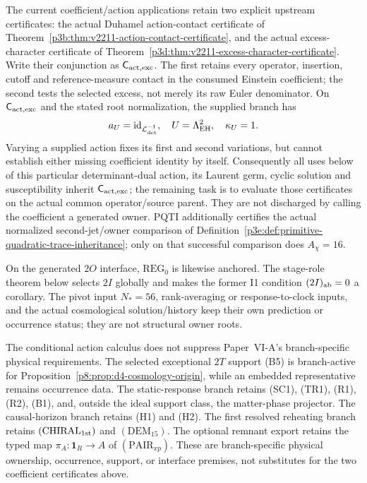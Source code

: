 \documentclass[12pt,a4paper]{article}
\begin{document}
\begin{remark}
\label{p8:rem:compressed-residual-status-through-ix}
The current coefficient/action applications retain two explicit upstream
certificates: the actual Duhamel action-contact certificate of
Theorem~\ref{p3b:thm:v2211-action-contact-certificate}, and the actual
excess-character certificate of
Theorem~\ref{p3d:thm:v2211-excess-character-certificate}. Write their conjunction
as $\mathsf C_{\rm act,exc}$. The first retains every operator, insertion,
cutoff and reference-measure contact in the consumed Einstein coefficient;
the second tests the selected excess, not merely its raw Euler denominator.
On $\mathsf C_{\rm act,exc}$ and the stated root normalization, the supplied
branch has
\[
 a_U=\operatorname{id}_{\mathcal L_{\det}^{-1}},\quad
 U=\Lambda_{\rm EH}^{2},\quad \kappa_U=1.
\]
Varying a supplied action fixes its first and second variations, but cannot
establish either missing coefficient identity by itself. Consequently all
uses below of this particular determinant-dual action, its Laurent germ,
cyclic solution and susceptibility inherit $\mathsf C_{\rm act,exc}$; the
remaining task is to evaluate those certificates on the actual common
operator/source parent. They are not discharged by calling the coefficient
a generated owner. PQTI additionally certifies the actual normalized
second-jet/owner comparison of
Definition~\ref{p3e:def:primitive-quadratic-trace-inheritance}; only on
that successful comparison does $A_\chi=16$.

On the generated \(2O\) interface,
\(\mathrm{REG}_0\) is likewise anchored.  The stage-role theorem below
selects \(2I\) globally and makes the former I1 condition
\((2I)_{\rm ab}=0\) a corollary.  The pivot input \(N_*=56\),
rank-averaging or response-to-clock inputs, and the actual cosmological
solution/history keep their own prediction or occurrence status; they are
not structural owner roots.

The conditional action calculus does not suppress Paper~VI-A's branch-specific physical
requirements.  The selected exceptional \(2T\) support (B5) is
branch-active for Proposition~\ref{p8:prop:d4-cosmology-origin}, while an
embedded representative remains occurrence data.  The static-response branch
retains (SC1), (TR1), (R1), (R2), (B1), and, outside the ideal support class,
the matter-phase projector.  The causal-horizon branch retains (H1) and (H2).
The first resolved reheating branch retains
\((\mathrm{CHIRAL}_{\rm 1st})\) and \((\mathrm{DEM}_{15})\).  The optional
remnant export retains the typed map
\(\pi_A:\mathbf1_R\to A\) of \((\mathrm{PAIR}_{xp})\).  These are
branch-specific physical ownership, occurrence, support, or interface
premises, not substitutes for the two coefficient certificates above.


\end{remark}
\end{document}
